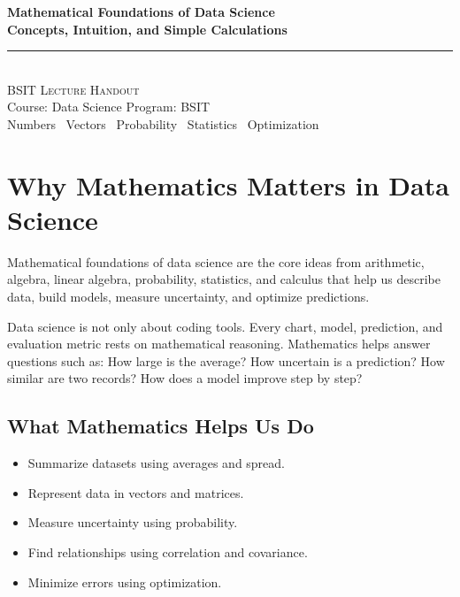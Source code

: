 \documentclass[11pt,a4paper]{article}
\begin{document}
\begin{center}
\vspace*{0.5cm}
{\Huge\bfseries\textcolor{primary}{Mathematical Foundations of Data Science}}\\[8pt]
{\Large\bfseries\textcolor{primary}{Concepts, Intuition, and Simple Calculations}}\\[16pt]
{\color{secondary}\rule{0.74\textwidth}{1.5pt}}\\[12pt]
{\Large\textsc{BSIT Lecture Handout}}\\[6pt]
{\large\textcolor{gray!70!black}{Course: Data Science \quad Program: BSIT}}\\[8pt]
{\normalsize\textcolor{gray!70!black}{Numbers \textbullet\ Vectors \textbullet\ Probability \textbullet\ Statistics \textbullet\ Optimization}}
\vspace{0.3cm}
\end{center}

\tableofcontents
\newpage

\section{Why Mathematics Matters in Data Science}

\begin{definitionbox}
Mathematical foundations of data science are the core ideas from arithmetic, algebra, linear algebra, probability, statistics, and calculus that help us describe data, build models, measure uncertainty, and optimize predictions.
\end{definitionbox}

\begin{conceptbox}
Data science is not only about coding tools. Every chart, model, prediction, and evaluation metric rests on mathematical reasoning. Mathematics helps answer questions such as: How large is the average? How uncertain is a prediction? How similar are two records? How does a model improve step by step?
\end{conceptbox}

\subsection{What Mathematics Helps Us Do}

\begin{itemize}[leftmargin=*]
  \item Summarize datasets using averages and spread.
  \item Represent data in vectors and matrices.
  \item Measure uncertainty using probability.
  \item Find relationships using correlation and covariance.
  \item Minimize errors using optimization.
\end{itemize}
\end{document}
